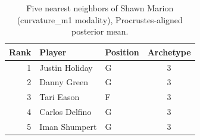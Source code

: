 \begin{table}[htbp]
  \centering\small
  \begin{tabular}{rllc}
    \toprule
    Rank & Player & Position & Archetype \\
    \midrule
    1 & Justin Holiday & G & 3 \\
    2 & Danny Green & G & 3 \\
    3 & Tari Eason & F & 3 \\
    4 & Carlos Delfino & G & 3 \\
    5 & Iman Shumpert & G & 3 \\
    \bottomrule
  \end{tabular}
  \caption{Five nearest neighbors of Shawn Marion (curvature_m1 modality), Procrustes-aligned posterior mean.}
  \label{tab:Shawn_Marion_neighbors_curvature_m1}
\end{table}

